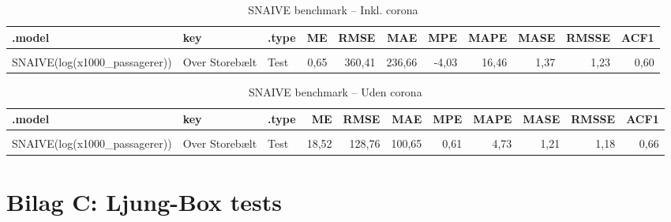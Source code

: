 \documentclass[
  danish,
]{article}
\begin{document}
\begin{table}[!h]
\centering
\caption{\label{tab:benchmark-bilag}SNAIVE benchmark – Inkl. corona}
\centering
\begin{tabular}[t]{lllrrrrrrrr}
\toprule
.model & key & .type & ME & RMSE & MAE & MPE & MAPE & MASE & RMSSE & ACF1\\
\midrule
\cellcolor{gray!10}{SNAIVE(log(x1000\_passagerer))} & \cellcolor{gray!10}{International trafik i alt} & \cellcolor{gray!10}{Test} & \cellcolor{gray!10}{3,68} & \cellcolor{gray!10}{929,59} & \cellcolor{gray!10}{532,93} & \cellcolor{gray!10}{-16,92} & \cellcolor{gray!10}{34,73} & \cellcolor{gray!10}{1,26} & \cellcolor{gray!10}{1,21} & \cellcolor{gray!10}{0,82}\\
SNAIVE(log(x1000\_passagerer)) & Over Storebælt & Test & 0,65 & 360,41 & 236,66 & -4,03 & 16,46 & 1,37 & 1,23 & 0,60\\
\bottomrule
\end{tabular}
\end{table}

\begin{table}[!h]
\centering
\caption{\label{tab:benchmark-bilag}SNAIVE benchmark – Uden corona}
\centering
\begin{tabular}[t]{lllrrrrrrrr}
\toprule
.model & key & .type & ME & RMSE & MAE & MPE & MAPE & MASE & RMSSE & ACF1\\
\midrule
\cellcolor{gray!10}{SNAIVE(log(x1000\_passagerer))} & \cellcolor{gray!10}{International trafik i alt} & \cellcolor{gray!10}{Test} & \cellcolor{gray!10}{117,16} & \cellcolor{gray!10}{259,98} & \cellcolor{gray!10}{191,78} & \cellcolor{gray!10}{2,80} & \cellcolor{gray!10}{5,09} & \cellcolor{gray!10}{1,01} & \cellcolor{gray!10}{1,03} & \cellcolor{gray!10}{0,34}\\
SNAIVE(log(x1000\_passagerer)) & Over Storebælt & Test & 18,52 & 128,76 & 100,65 & 0,61 & 4,73 & 1,21 & 1,18 & 0,66\\
\bottomrule
\end{tabular}
\end{table}

\section*{Bilag C: Ljung-Box tests}\label{sec-bilag-c}
\end{document}
